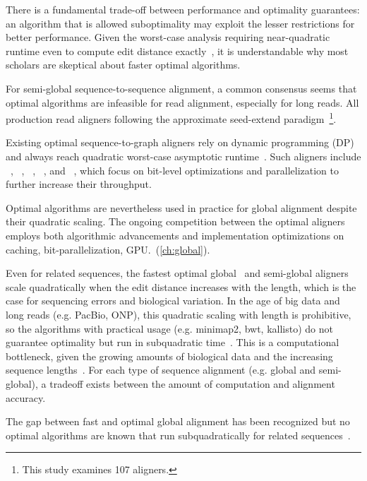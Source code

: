 There is a fundamental trade-off between performance and optimality guarantees:
an algorithm that is allowed suboptimality may exploit the lesser restrictions
for better performance. Given the worst-case analysis requiring near-quadratic
runtime even to compute edit distance exactly~\citep{backurs2015edit}, it is
understandable why most scholars are skeptical about faster optimal algorithms.

For semi-global sequence-to-sequence alignment, a common consensus seems that
optimal algorithms are infeasible for read alignment, especially for long reads.
All production read aligners following the approximate seed-extend
paradigm~\cite{alser2021technology}\footnote{This study examines 107 aligners.}.

Existing optimal sequence-to-graph aligners rely on dynamic programming (DP) and
always reach quadratic worst-case asymptotic runtime~\citep{equi2019complexity}.
Such aligners include \vargas~\citep{darby2020vargas},
\pasgal~\citep{jain_accelerating_2019},
\graphaligner~\citep{rautiainen_bitparallel_2019},
\hga~\citep{feng2021accelerating}, and \vg~\citep{garrison_variation_2018},
which focus on bit-level optimizations and parallelization to further increase
their throughput.

Optimal algorithms are nevertheless used in practice for global alignment
despite their quadratic scaling. The ongoing competition between the optimal
aligners employs both algorithmic advancements and implementation optimizations
on caching, bit-parallelization, GPU.~(\cref{ch:global}).

Even for related sequences, the fastest optimal
global~\citep{marco2021fast,vsovsic2017edlib} and semi-global
aligners~\citep{rautiainen_bitparallel_2019} scale quadratically when the edit
distance increases with the length, which is the case for sequencing errors and
biological variation. In the age of big data and long reads (e.g. PacBio, ONP),
this quadratic scaling with length is prohibitive, so the algorithms with
practical usage (e.g. minimap2, bwt, kallisto) do not guarantee optimality but
run in subquadratic time~\citep{kucherov2019evolution}. This is a computational
bottleneck, given the growing amounts of biological data and the increasing
sequence lengths~\citep{kucherov2019evolution}. For each type of sequence
alignment (e.g. global and semi-global), a tradeoff exists between the amount of
computation and alignment accuracy.

The gap between fast and optimal global alignment has been recognized but no
optimal algorithms are known that run subquadratically for related
sequences~\citep{medvedev2022theoretical}.

